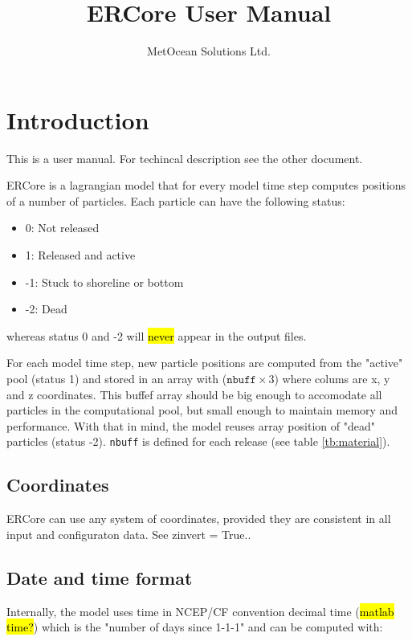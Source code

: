 \documentclass[a4paper]{article}
\title{ERCore User Manual}
\author{MetOcean Solutions Ltd.}
\begin{document}
\maketitle

\section{Introduction}

This is a user manual. For techincal description see the other document.

ERCore is a lagrangian model that for every model time step computes positions of a number of particles. Each particle can have the following status:

\begin{itemize}
\item 0: Not released
\item 1: Released and active
\item -1: Stuck to shoreline or bottom
\item -2: Dead
\end{itemize}
 
whereas status 0 and -2 will \hl{never} appear in the output files.

For each model time step, new particle positions are computed from the "active" pool (status 1) and stored in an array with ($\texttt{nbuff}\times 3$)  where colums are x, y and z coordinates. This buffef array should be big enough to accomodate all particles in the computational pool, but small enough to maintain memory and performance. With that in mind, the model reuses array position of "dead" particles (status -2).  \texttt{nbuff} is defined for each release (see table \ref{tb:material}). 

\subsection{Coordinates}
\label{ssec:coords}

ERCore can use any system of coordinates, provided they are consistent in all input and configuraton data. See zinvert = True..


\subsection{Date and time format}
\label{ssec:datetime}

Internally, the model uses time in NCEP/CF convention decimal time (\hl{matlab time?}) which is the "number of days since 1-1-1"  and can be computed with:
\end{document}
